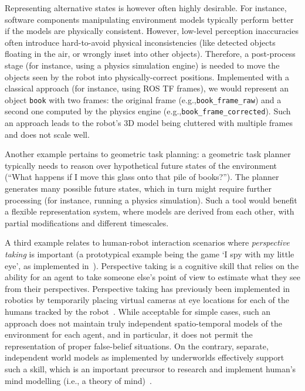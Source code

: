 \documentclass[letterpaper, 10pt, conference]{ieeeconf}
\newcommand{\eg}{e.g.,\xspace}
\newcommand{\ie}{i.e.,\xspace}
\newcommand{\uwds}{{\sc underworlds}\xspace}
\begin{document}
Representing alternative states is however often highly desirable. For instance,
software components manipulating environment models typically perform better if
the models are physically consistent. However, low-level perception inaccuracies
often introduce hard-to-avoid physical inconsistencies (like detected objects
floating in the air, or wrongly inset into other objects).
Therefore, a post-process stage (for instance, using a physics simulation
engine) is needed to move the objects seen by the robot into
physically-correct positions. Implemented with a classical approach (for
instance, using ROS TF frames), we would represent an object {\tt book} with two
frames: the original frame (\eg {\tt book\_frame\_raw}) and a second one
computed by the physics engine (\eg {\tt book\_frame\_corrected}). Such an
approach leads to the robot's 3D model being cluttered with multiple frames and
does not scale well.

Another example pertains to geometric task planning: a geometric task planner
typically needs to reason over hypothetical future states of the environment
(``What happens if I move this glass onto that pile of books?'').  The planner
generates many possible future states, which in turn might require further
processing (for instance, running a physics simulation). Such a tool would
benefit a flexible representation system, where models are derived from each
other, with partial modifications and different timescales.

A third example relates to human-robot interaction scenarios where
\emph{perspective taking} is important (a prototypical example being the game `I
spy with my little eye', as implemented in~\cite{ros2010which}). Perspective
taking is a cognitive skill that relies on the ability for an agent to take
someone else's point of view to estimate what they see from their perspectives.
Perspective taking has previously been implemented in robotics by temporarily
placing virtual cameras at eye locations for each of the humans tracked by the
robot~\cite{ros2010solving}. While acceptable for simple cases, such an approach
does not maintain truly independent spatio-temporal models of the environment
for each agent, and in particular, it does not permit the representation of
proper false-belief situations. On the contrary, separate, independent world
models as implemented by \uwds effectively support such a skill, which is an
important precursor to research and implement human's mind modelling (\ie a
theory of mind)~\cite{lemaignan2015mutual}.
\end{document}
